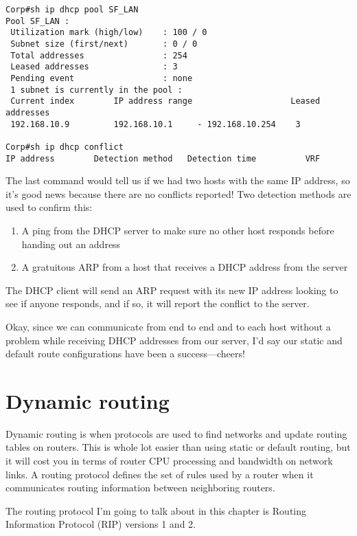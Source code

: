 \begin{verbatim}
Corp#sh ip dhcp pool SF_LAN
Pool SF_LAN :
 Utilization mark (high/low)    : 100 / 0
 Subnet size (first/next)       : 0 / 0
 Total addresses                : 254
 Leased addresses               : 3
 Pending event                  : none
 1 subnet is currently in the pool :
 Current index        IP address range                    Leased addresses
 192.168.10.9         192.168.10.1     - 192.168.10.254    3
 
Corp#sh ip dhcp conflict
IP address        Detection method   Detection time          VRF
\end{verbatim}

The last command would tell us if we had two hosts with the same IP
address, so it's good news because there are no conflicts reported! Two
detection methods are used to confirm this:

\begin{enumerate}
\tightlist
\item
  A ping from the DHCP server to make sure no other host responds before
  handing out an address
\item
  A gratuitous ARP from a host that receives a DHCP address from the
  server
\end{enumerate}

The DHCP client will send an ARP request with its new IP address looking
to see if anyone responds, and if so, it will report the conflict to the
server.

Okay, since we can communicate from end to end and to each host without
a problem while receiving DHCP addresses from our server, I'd say our
static and default route configurations have been a success---cheers!



\section{Dynamic routing}

Dynamic routing is when protocols are used to find networks and update
routing tables on routers. This is whole lot easier than using static or
default routing, but it will cost you in terms of router CPU processing
and bandwidth on network links. A routing protocol defines the set of
rules used by a router when it communicates routing information between
neighboring routers.

The routing protocol I'm going to talk about in this chapter is Routing
Information Protocol (RIP) versions 1 and 2.

